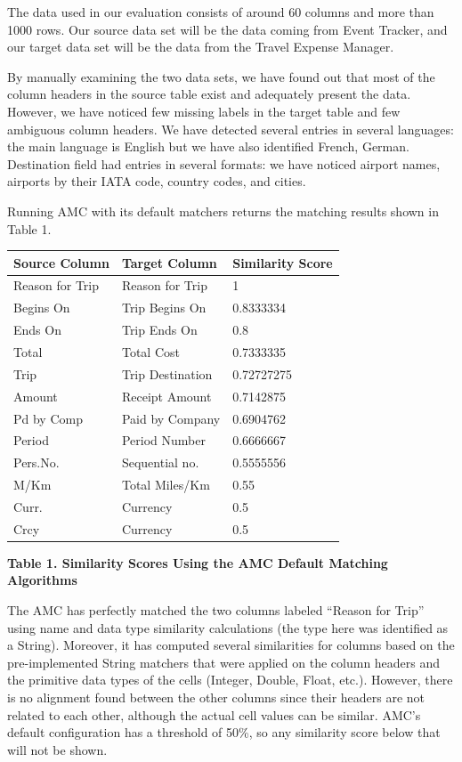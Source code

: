 \documentclass{sig-alternate}
\begin{document}
The data used in our evaluation consists of around 60 columns and more than 1000 rows. Our source data set will be the data coming from Event Tracker, and our target data set will be the data from the Travel Expense Manager.

By manually examining the two data sets, we have found out that most of the column headers in the source table exist and adequately present the data. However, we have noticed few missing labels in the target table and few ambiguous column headers. We have detected several entries in several languages: the main language is English but we have also identified French, German. Destination field had entries in several formats: we have noticed airport names, airports by their IATA code, country codes, and cities.

Running AMC with its default matchers returns the matching results shown in Table 1.



\begin{tabular}{|p{0.7in}|p{0.8in}|p{0.8in}|} \hline 
\textbf{Source Column} & \textbf{Target Column} & \textbf{Similarity Score} \\ \hline 
Reason for Trip & Reason for Trip & 1 \\ \hline 
Begins On & Trip Begins On & 0.8333334 \\ \hline 
Ends On & Trip Ends On & 0.8 \\ \hline 
Total & Total Cost & 0.7333335 \\ \hline 
Trip & Trip Destination & 0.72727275 \\ \hline 
Amount & Receipt Amount & 0.7142875 \\ \hline 
Pd by Comp & Paid by Company & 0.6904762 \\ \hline 
Period & Period Number & 0.6666667 \\ \hline 
Pers.No. & Sequential no. & 0.5555556 \\ \hline 
M/Km & Total Miles/Km & 0.55 \\ \hline 
Curr. & Currency & 0.5 \\ \hline 
Crcy & Currency & 0.5 \\ \hline 
\end{tabular}



\textbf{Table 1. Similarity Scores Using the AMC Default Matching Algorithms}

The AMC has perfectly matched the two columns labeled ``Reason for Trip'' using name and data type similarity calculations (the type here was identified as a String). Moreover, it has computed several similarities for columns based on the pre-implemented String matchers that were applied on the column headers and the primitive data types of the cells (Integer, Double, Float, etc.). However, there is no alignment found between the other columns since their headers are not related to each other, although the actual cell values can be similar. AMC's default configuration has a threshold of 50\%, so any similarity score below that will not be shown.
\end{document}
